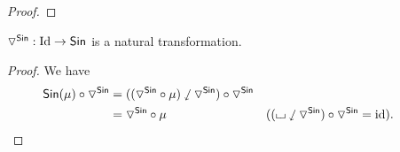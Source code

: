 \documentclass[a4paper]{memoir}
\begin{document}
{\begin{proof}
\end{proof}
\begin{theorem}
	${\triangledown}^{\mathsf{Sin}} : \mathrm{Id} \to {\mathsf{Sin}}$ is a natural transformation.
\end{theorem}
\begin{proof}
	We have
	\begin{align*}
		\Sin(\mu) \circ \cohcodisc^\Sin
		&= ((\cohcodisc^\Sin \circ \mu) \divleft \cohcodisc^\Sin) \circ \cohcodisc^\Sin \\
		&= \cohcodisc^\Sin \circ \mu
		& ((\loch \divleft \cohcodisc^\Sin) \circ \cohcodisc^\Sin = \id)&. && \qedhere

\end{align*}
\end{proof}}
\end{document}
